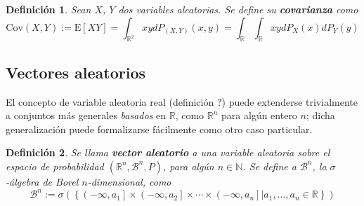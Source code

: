 \documentclass[12pt,letterpaper,draft]{book}
\newtheorem{definicion}{Definición}[chapter]
\newtheorem{proposicion}[teorema]{Proposición}
\newcommand{\R}{\mathbb{R}}
\newcommand{\N}{\mathbb{N}}
\newcommand{\COS}[1]{\mathrm{cos}\left( #1 \right)}
\newcommand{\SEN}[1]{\mathrm{sen}\left( #1 \right)}
\newcommand{\E}[1]{\mathrm{E}\left[ #1 \right]}
\newcommand{\Var}[1]{\mathrm{Var}\left( #1 \right)}
\newcommand{\Cov}[1]{\mathrm{Cov}\left( #1 \right)}
\begin{document}


\begin{definicion}
Sean $X$, $Y$ dos variables aleatorias. Se define su \textbf{covarianza} como
\begin{equation}
\Cov{X,Y} := \E{X Y} = \int_{\R^{2}} x y d P_{(X,Y)}(x,y) = \int_\R \int_\R x y dP_X(x) dP_Y(y)
\end{equation}
\end{definicion}



\subsection{Vectores aleatorios}

El concepto de variable aleatoria real (definición ?) puede extenderse trivialmente a conjuntos más generales \textit{basados} en $\R$, como $\R^{n}$ para algún entero $n$; dicha generalización puede formalizarse fácilmente como otro caso particular.

\begin{definicion}
Se llama \textbf{vector aleatorio} a una variable aleatoria sobre el espacio de probabilidad $(\R^{n},\mathcal{B}^{n},P)$, para algún $n\in \N$. Se define a $\mathcal{B}^{n}$, la $\sigma$-álgebra de Borel $n$-dimensional, como
\begin{equation}
\mathcal{B}^{n} := \sigma\left(\left\{ \left(-\infty, a_1\right]\times \left(-\infty, a_2\right]\times \cdots \times \left(-\infty, a_n\right] \lvert a_1, \dots, a_n \in \R \right\}\right)
\end{equation}
\end{definicion}
\end{document}
